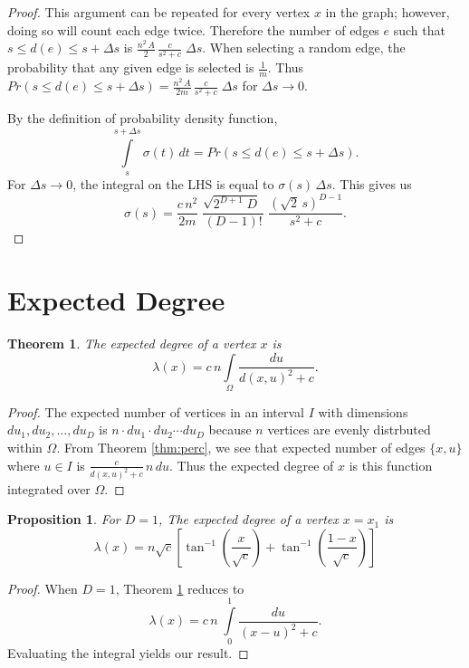 \documentclass[a4paper,10pt]{article}
\newtheorem{prop}{Proposition}
\newtheorem{theorem}{Theorem}
\begin{document}
\begin{proof}
This argument can be repeated for every vertex $x$ in the graph; however, doing so will count each edge twice. Therefore the number of edges $e$ such that $s \leq d(e) \leq s + \Delta s$ is $\frac{n^2\,A}{2}\,\frac{c}{s^2 + c} \; \Delta s $. When selecting a random edge, the probability that any given edge is selected is $\frac{1}{m}$. Thus $Pr(s \leq d(e) \leq s + \Delta s) = \frac{n^2\,A}{2m}\,\frac{c}{s^2 + c} \; \Delta s $ for $\Delta s \to 0.$

By the definition of probability density function, 
\begin{equation}
 \int\limits_{s}^{s + \Delta s} \sigma(t)\,dt = Pr(s \leq d(e) \leq s + \Delta s).
\end{equation}
For $\Delta s \to 0$, the integral on the LHS is equal to $\sigma(s) \, \Delta s$. This gives us
 \begin{equation}
  \sigma(s) = \frac{c\,n^2}{2m}\;\frac{\sqrt{2^{D+1}\;D} \;}{(D-1)!}\;\frac{(\sqrt{2}\,s)^{D-1}}{s^2 + c}.
 \end{equation}
\end{proof}

\section{Expected Degree}
\begin{theorem}
\label{thm:lambdax}
The expected degree of a vertex $x$ is
 \begin{equation}
 \lambda(x) = c\,n\int\limits_\Omega \frac{du}{d(x, u)^2 + c}.
\end{equation}
\end{theorem}
\begin{proof}
The expected number of vertices in an interval $I$ with dimensions $du_1, du_2, \ldots, du_D$  is $n \cdot du_1 \cdot du_2 \cdots du_D$ because $n$ vertices are evenly distrbuted within $\Omega$. From Theorem \ref{thm:perc}, we see that expected number of edges $\{x, u\}$ where $u \in I$ is $\frac{c}{d(x, u)^2 + c} \, n \, du$. Thus the expected degree of $x$ is this function integrated over $\Omega$.
\end{proof}

\begin{prop}
\label{prop:lambdax1}
For $D = 1$, The expected degree of a vertex $x = x_1$ is
 \begin{equation}
 \lambda(x) = n\sqrt{c}\left[\tan^{-1}\left(\frac{x}{\sqrt{c}}\right)+\tan^{-1}\left(\frac{1-x}{\sqrt{c}}\right)\right]
\end{equation}
\end{prop}
\begin{proof}
When $D=1$, Theorem \ref{thm:lambdax} reduces to
\begin{equation}
 \lambda(x) = c\,n\;\int\limits_{0}^{1} \frac{du}{(x - u)^2 + c}.
\end{equation}
Evaluating the integral yields our result.
\end{proof}
\end{document}
